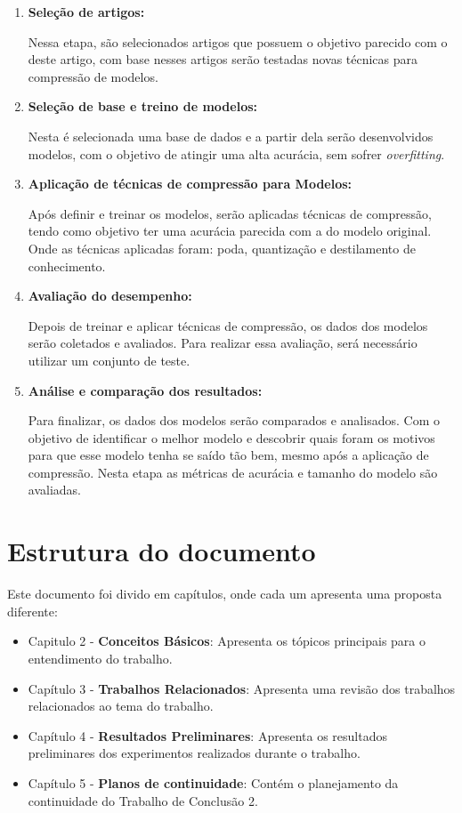 \begin{enumerate}
	\item \textbf{Seleção de artigos:}

		Nessa etapa, são selecionados artigos que possuem o objetivo parecido com o deste artigo,
		com base nesses artigos serão testadas novas técnicas para compressão de modelos.

	\item \textbf{Seleção de base e treino de modelos:}

		Nesta é selecionada uma base de dados e a partir dela serão desenvolvidos modelos,
		com o objetivo de atingir uma alta acurácia, sem sofrer \textit{overfitting}.

	\item \textbf{Aplicação de técnicas de compressão para Modelos:}

		Após definir e treinar os modelos, serão aplicadas técnicas de compressão, tendo como
		objetivo ter uma acurácia parecida com a do modelo original. Onde as técnicas aplicadas
		foram: poda, quantização e destilamento de conhecimento.

	\item \textbf{Avaliação do desempenho:}

		Depois de treinar e aplicar técnicas de compressão, os dados dos modelos serão coletados e
		avaliados. Para realizar essa avaliação, será necessário utilizar um conjunto de teste.

	\item \textbf{Análise e comparação dos resultados:}

		Para finalizar, os dados dos modelos serão comparados e analisados. Com o objetivo de
		identificar o melhor modelo e descobrir quais foram os motivos para que esse modelo tenha se
		saído tão bem, mesmo após a aplicação de compressão. Nesta etapa as métricas de acurácia e
		tamanho do modelo são avaliadas.

\end{enumerate}

\section{Estrutura do documento}
Este documento foi divido em capítulos, onde cada um apresenta uma proposta diferente:
\begin{itemize}
	\item Capitulo 2 - \textbf{Conceitos Básicos}: Apresenta os tópicos principais para o entendimento
		do trabalho.
	\item Capítulo 3 - \textbf{Trabalhos Relacionados}: Apresenta uma revisão dos trabalhos
		relacionados ao tema do trabalho.
	\item Capítulo 4 - \textbf{Resultados Preliminares}: Apresenta os resultados preliminares dos
		experimentos realizados durante o trabalho.
	\item Capítulo 5 - \textbf{Planos de continuidade}: Contém o planejamento da continuidade do
		Trabalho de Conclusão 2.
\end{itemize}
